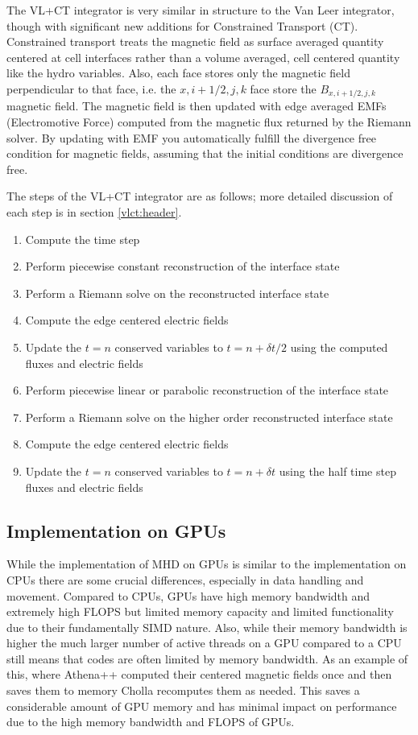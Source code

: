 The VL+CT integrator is very similar in structure to the Van Leer integrator, though with significant new additions for Constrained Transport (CT). Constrained transport treats the magnetic field as surface averaged quantity centered at cell interfaces rather than a volume averaged, cell centered quantity like the hydro variables. Also, each face stores only the magnetic field perpendicular to that face, i.e. the $x,i+1/2,j,k$ face store the $B_{x,i+1/2,j,k}$ magnetic field. The magnetic field is then updated with edge averaged EMFs (Electromotive Force) computed from the magnetic flux returned by the Riemann solver. By updating with EMF you automatically fulfill the divergence free condition for magnetic fields, assuming that the initial conditions are divergence free.

The steps of the VL+CT integrator are as follows; more detailed discussion of each step is in section \ref{vlct:header}.

\begin{enumerate}
    \item Compute the time step
    \item Perform piecewise constant reconstruction of the interface state
    \item Perform a Riemann solve on the reconstructed interface state
    \item Compute the edge centered electric fields
    \item Update the $t=n$ conserved variables to $t=n+\delta t/2$ using the computed fluxes and electric fields
    \item Perform piecewise linear or parabolic reconstruction of the interface state
    \item Perform a Riemann solve on the higher order reconstructed interface state
    \item Compute the edge centered electric fields
    \item Update the $t=n$ conserved variables to $t=n+\delta t$ using the half time step fluxes and electric fields
\end{enumerate}

\subsection{Implementation on GPUs}

While the implementation of MHD on GPUs is similar to the implementation on CPUs there are some crucial differences, especially in data handling and movement. Compared to CPUs, GPUs have high memory bandwidth and extremely high FLOPS but limited memory capacity and limited functionality due to their fundamentally SIMD nature. Also, while their memory bandwidth is higher the much larger number of active threads on a GPU compared to a CPU still means that codes are often limited by memory bandwidth. As an example of this, where Athena++ computed their centered magnetic fields once and then saves them to memory Cholla recomputes them as needed. This saves a considerable amount of GPU memory and has minimal impact on performance due to the high memory bandwidth and FLOPS of GPUs.

